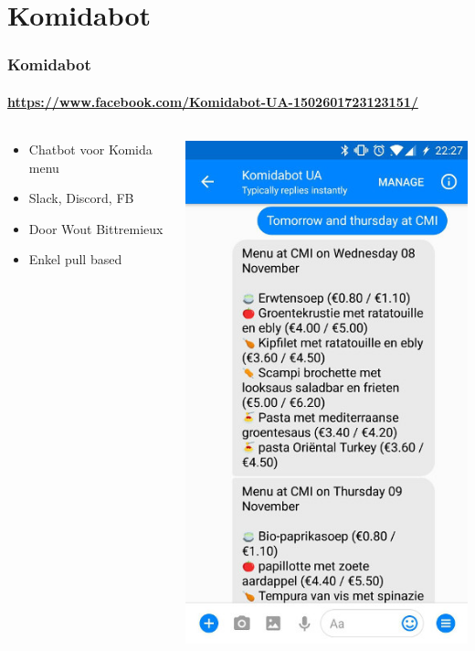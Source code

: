 \section{Komidabot}
\begin{frame}
    \frametitle{Komidabot}
    \framesubtitle{\url{https://www.facebook.com/Komidabot-UA-1502601723123151/}}
	
    \begin{columns}
      \begin{column}{0.6\textwidth}
      	\begin{itemize}
        	\item Chatbot voor Komida menu
            \item Slack, Discord, FB
            \item Door Wout Bittremieux
            \item Enkel pull based
        \end{itemize}
      \end{column}
      \begin{column}{0.4\textwidth}
        \begin{center}
          \includegraphics[height=0.9\textheight]{res/komidabot_fb}
        \end{center}
      \end{column}
    \end{columns}    
\end{frame}

